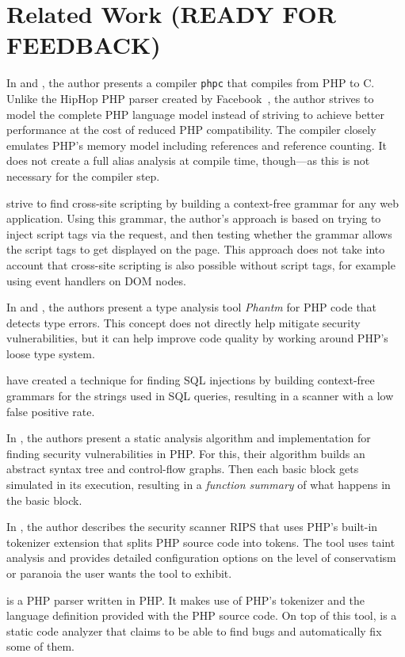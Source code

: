\chapter{Related Work (READY FOR FEEDBACK)}
\label{related-work}

In \cite{phpc-thesis} and \cite{phpc-paper}, the author presents a compiler \texttt{phpc} that compiles from PHP to C. Unlike the HipHop PHP parser created by Facebook~\cite{hiphop}, the author strives to model the complete PHP language model instead of striving to achieve better performance at the cost of reduced PHP compatibility. The compiler closely emulates PHP's memory model including references and reference counting. It does not create a full alias analysis at compile time, though---as this is not necessary for the compiler step.

\cite{xss-via-grammar} strive to find cross-site scripting by building a context-free grammar for any web application. Using this grammar, the author's approach is based on trying to inject script tags via the request, and then testing whether the grammar allows the script tags to get displayed on the page. This approach does not take into account that cross-site scripting is also possible without script tags, for example using event handlers on DOM nodes.

In \cite{phantom-1} and \cite{phantom-2}, the authors present a type analysis tool \emph{Phantm} for PHP code that detects type errors. This concept does not directly help mitigate security vulnerabilities, but it can help improve code quality by working around PHP's loose type system.

\cite{wassermann-sound} have created a technique for finding SQL injections by building context-free grammars for the strings used in SQL queries, resulting in a scanner with a low false positive rate.

In \cite{static-php}, the authors present a static analysis algorithm and implementation for finding security vulnerabilities in PHP. For this, their algorithm builds an abstract syntax tree and control-flow graphs. Then each basic block gets simulated in its execution, resulting in a \emph{function summary} of what happens in the basic block.

In \cite{rips}, the author describes the security scanner RIPS that uses PHP's built-in tokenizer extension that splits PHP source code into tokens. The tool uses taint analysis and provides detailed configuration options on the level of conservatism or paranoia the user wants the tool to exhibit.

\cite{php-parser-popov} is a PHP parser written in PHP. It makes use of PHP's tokenizer and the language definition provided with the PHP source code. On top of this tool, \cite{php-analyzer} is a static code analyzer that claims to be able to find bugs and automatically fix some of them.
